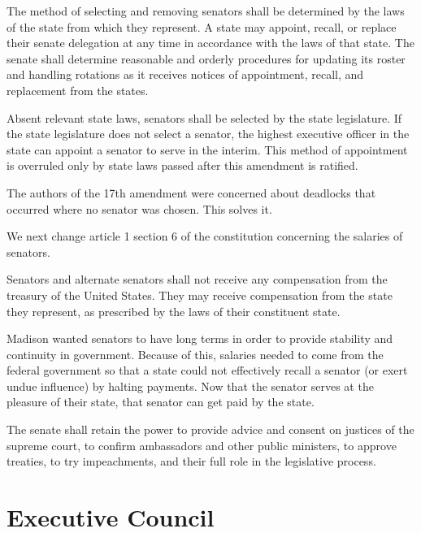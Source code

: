\documentclass{article}
\begin{document}
\begin{quoting}
The method of selecting and removing senators shall be determined by the laws of the state from which they represent. A state may appoint, recall, or replace their senate delegation at any time in accordance with the laws of that state. The senate shall determine reasonable and orderly procedures for updating its roster and handling rotations as it receives notices of appointment, recall, and replacement from the states.

Absent relevant state laws, senators shall be selected by the state legislature. If the state legislature does not select a senator, the highest executive officer in the state can appoint a senator to serve in the interim. This method of appointment is overruled only by state laws passed after this amendment is ratified.
\end{quoting}

The authors of the 17th amendment were concerned about deadlocks that occurred where no senator was chosen. This solves it.

We next change article 1 section 6 of the constitution concerning the salaries of senators.

\begin{quoting}
Senators and alternate senators shall not receive any compensation from the treasury of the United States. They may receive compensation from the state they represent, as prescribed by the laws of their constituent state.
\end{quoting}

Madison wanted senators to have long terms in order to provide stability and continuity in government.\cite{Senate} Because of this, salaries needed to come from the federal government so that a state could not effectively recall a senator (or exert undue influence) by halting payments. Now that the senator serves at the pleasure of their state, that senator can get paid by the state.

\begin{quoting}
The senate shall retain the power to provide advice and consent on justices of the supreme court, to confirm ambassadors and other public ministers, to approve treaties, to try impeachments, and their full role in the legislative process.
\end{quoting}

\section{Executive Council}
\end{document}
